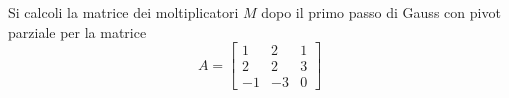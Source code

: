 Si calcoli la matrice dei moltiplicatori $M$ dopo il primo passo 
di Gauss con pivot parziale per la matrice
\bigskip
\[
A=\left[
\begin{array}{ccc}
1 & 2 & 1 \\
2 & 2 & 3\\
-1 & -3 & 0
\end{array}\right]
\]

